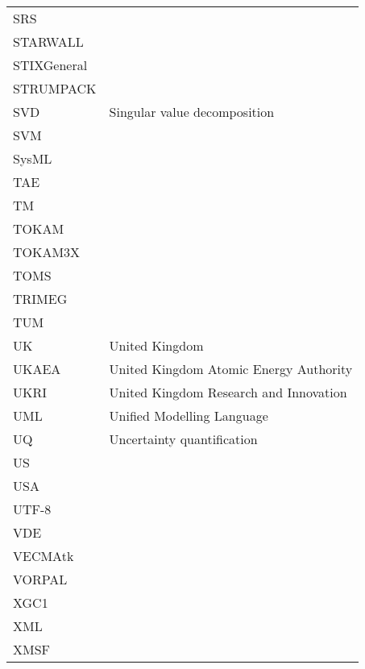 \begin{longtable}{|p{4.0cm}|p{12.0cm}|}
SRS & \\
STARWALL & \\
STIXGeneral & \\
STRUMPACK & \\
SVD & Singular value decomposition \\
SVM & \\
SysML  & \\
TAE & \\
TM & \\
TOKAM & \\
TOKAM3X & \\
TOMS & \\
TRIMEG & \\
TUM & \\
UK & United Kingdom \\
UKAEA & United Kingdom Atomic Energy Authority \\
UKRI & United Kingdom Research and Innovation \\
UML & Unified Modelling Language\\
UQ & Uncertainty quantification \\
US & \\
USA & \\
UTF-8 & \\
VDE & \\
VECMAtk & \\
VORPAL & \\
XGC1 & \\
XML & \\
XMSF & \\ \hline
\end{longtable}
